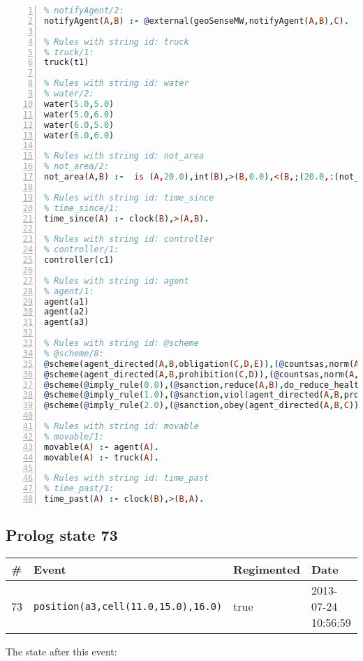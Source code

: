 \documentclass[11pt]{article}\usepackage[utf8]{inputenc}\usepackage{geometry}
\begin{document}
\begin{lstlisting}[language=Prolog, numbers=left]
% Rules with string id: notifyAgent
% notifyAgent/2:
notifyAgent(A,B) :- @external(geoSenseMW,notifyAgent(A,B),C).

% Rules with string id: truck
% truck/1:
truck(t1)

% Rules with string id: water
% water/2:
water(5.0,5.0)
water(5.0,6.0)
water(6.0,5.0)
water(6.0,6.0)

% Rules with string id: not_area
% not_area/2:
not_area(A,B) :-  is (A,20.0),int(B),>(B,0.0),<(B,;(20.0,:(not_area(A,B), is (-(B),20.0)))),int(A),>(A,0.0),<(A,;(20.0,:(area(A,B),-(int(A))))),int(B),>(A,0.0),>(B,0.0),<(A,21.0),<(B,21.0).

% Rules with string id: time_since
% time_since/1:
time_since(A) :- clock(B),>(A,B).

% Rules with string id: controller
% controller/1:
controller(c1)

% Rules with string id: agent
% agent/1:
agent(a1)
agent(a2)
agent(a3)

% Rules with string id: @scheme
% @scheme/8:
@scheme(agent_directed(A,B,obligation(C,D,E)),(@countsas,norm(A,B,F,obligation(C,D,E)),F),false,(listTrue(C)),(time_past(D)),false,[plus(viol(agent_directed(A,B,obligation(C,D,E))))|[]],[plus(obey(agent_directed(A,B,obligation(C,D,E))))|[]])
@scheme(agent_directed(A,B,prohibition(C,D)),(@countsas,norm(A,B,E,prohibition(C,D)),E),(listTrue(C)),false,(false),false,[plus(viol(agent_directed(A,B,prohibition(C,D))))|[]],[plus(obey(agent_directed(A,B,prohibition(C,D))))|[]])
@scheme(@imply_rule(0.0),(@sanction,reduce(A,B),do_reduce_health(A,B),notifyAgent(A,changed(status))),true,false,false,false,[min(reduce(A,B))|[]],[])
@scheme(@imply_rule(1.0),(@sanction,viol(agent_directed(A,B,prohibition(C,D))),do_sanction(D)),true,false,false,false,[min(viol(agent_directed(A,B,prohibition(C,D))))|[]],[])
@scheme(@imply_rule(2.0),(@sanction,obey(agent_directed(A,B,C))),true,false,false,false,[min(obey(agent_directed(A,B,C)))|[]],[])

% Rules with string id: movable
% movable/1:
movable(A) :- agent(A).
movable(A) :- truck(A).

% Rules with string id: time_past
% time_past/1:
time_past(A) :- clock(B),>(B,A).

\end{lstlisting}
\clearpage 
\subsection{Prolog state 73}
\begin{table}[ht]
\centering 
\begin{tabular}{l l l l} 
\textbf{\#} & \textbf{Event} & \textbf{Regimented} & \textbf{Date} \\ [0.5ex] 
\hline
73&\texttt{position(a3,cell(11.0,15.0),16.0)}&true&2013-07-24 10:56:59\\ [1ex] \hline\end{tabular}
\end{table}
The state after this event:
\end{document}
